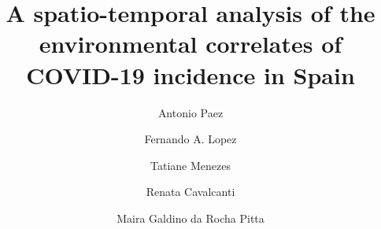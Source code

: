 \documentclass[]{elsarticle} %
\begin{document}
\begin{frontmatter}

  \title{A spatio-temporal analysis of the environmental correlates of COVID-19
incidence in Spain}
    \author[McMaster University]{Antonio Paez}
    \author[Universidad Politecnica de Cartagena]{Fernando A. Lopez}
    \author[Departamento de Economia]{Tatiane Menezes}
    \author[Nucleo de Pesquisa]{Renata Cavalcanti}
    \author[Nucleo de Pesquisa]{Maira Galdino da Rocha Pitta}
      \address[McMaster University]{School of Geography and Earth Sciences, McMaster University, 1281 Main
St W, Hamilton, ON, L8S 4K1, Canada}
    \address[Universidad Politecnica de Cartagena]{Departamento de Metodos Cuantitativos, Ciencias Juridicas, y Lenguas
Modernas, Universidad Politecnica de Cartagena, Calle Real Numero 3,
30201, Cartagena, Murcia, Spain}
    \address[Departamento de Economia]{Departamento de Economia, Universidade Federal de Pernambuco, Av dos
Economistas, s/n - Cidade Universitária, Recife - PE, 50670-901, Brasil}
    \address[Nucleo de Pesquisa]{Núcleo de Pesquisa em Inovação Terapêutica NUPIT / UFPE, Av.
Prof.~Moraes Rego, 1235 - Cidade Universitária, Recife, PE, CEP
50670-901, Brazil}
  

\end{frontmatter}
\end{document}
